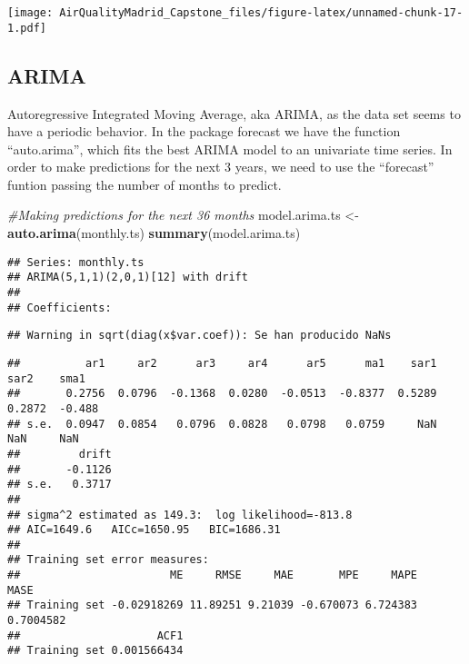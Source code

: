 \documentclass[
]{article}
\newenvironment{Shaded}{\begin{snugshade}}{\end{snugshade}}
\newcommand{\CommentTok}[1]{\textcolor[rgb]{0.56,0.35,0.01}{\textit{#1}}}
\newcommand{\KeywordTok}[1]{\textcolor[rgb]{0.13,0.29,0.53}{\textbf{#1}}}
\newcommand{\NormalTok}[1]{#1}
\newcommand{\StringTok}[1]{\textcolor[rgb]{0.31,0.60,0.02}{#1}}
\begin{document}
\texttt{[image: AirQualityMadrid\_Capstone\_files/figure-latex/unnamed-chunk-17-1.pdf]}

\hypertarget{arima}{%
\subsection{ARIMA}\label{arima}}

Autoregressive Integrated Moving Average, aka ARIMA, as the data set
seems to have a periodic behavior. In the package forecast we have the
function ``auto.arima'', which fits the best ARIMA model to an
univariate time series. In order to make predictions for the next 3
years, we need to use the ``forecast'' funtion passing the number of
months to predict.

\begin{Shaded}
\begin{Highlighting}[]
\CommentTok{#Making predictions for the next 36 months}
\NormalTok{model.arima.ts <-}\StringTok{ }\KeywordTok{auto.arima}\NormalTok{(monthly.ts)}
\KeywordTok{summary}\NormalTok{(model.arima.ts)}
\end{Highlighting}
\end{Shaded}

\begin{verbatim}
## Series: monthly.ts 
## ARIMA(5,1,1)(2,0,1)[12] with drift 
## 
## Coefficients:
\end{verbatim}

\begin{verbatim}
## Warning in sqrt(diag(x$var.coef)): Se han producido NaNs
\end{verbatim}

\begin{verbatim}
##          ar1     ar2      ar3     ar4      ar5      ma1    sar1    sar2    sma1
##       0.2756  0.0796  -0.1368  0.0280  -0.0513  -0.8377  0.5289  0.2872  -0.488
## s.e.  0.0947  0.0854   0.0796  0.0828   0.0798   0.0759     NaN     NaN     NaN
##         drift
##       -0.1126
## s.e.   0.3717
## 
## sigma^2 estimated as 149.3:  log likelihood=-813.8
## AIC=1649.6   AICc=1650.95   BIC=1686.31
## 
## Training set error measures:
##                       ME     RMSE     MAE       MPE     MAPE      MASE
## Training set -0.02918269 11.89251 9.21039 -0.670073 6.724383 0.7004582
##                     ACF1
## Training set 0.001566434
\end{verbatim}
\end{document}
